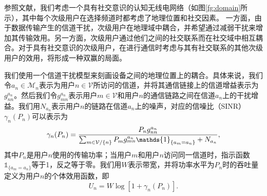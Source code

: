 参照文献\cite{Chenjournal}，我们考虑一个具有社交意识的认知无线电网络（如图\ref{fg:domain}所示），其中每个次级用户在选择频道时都考虑了地理位置和社交因素。
一方面，由于数据传输产生的信道干扰，次级用户在地理域中耦合，并希望通过减弱干扰来增加其传输效用。另一方面，次级用户通过他们之间的社交联系而在社交域中相互耦合。对于具有社交意识的次级用户，在进行通信时考虑与其有社交联系的其他次级用户的效用，将形成一种双赢的局面。

我们使用一个信道干扰模型来刻画设备之间的地理位置上的耦合。具体来说，我们令$a_n\in\mathcal{M}_n$表示为用户$n\in\mathcal{V}$所访问的信道，并将其通信链接上的信道增益表示为$g_{nn}^{a_n}$。然后我们令$g_{mn}^{a_n}$表示用户$m\in\mathcal{V}$和用户$n$的通信链路之间在信道$a_n$上的干扰增益。我们用$N_{a_n}$表示用户$n$的链路在信道$a_n$上的噪声，对应的信噪比（SINR）$\gamma_n(P_n)$可以表示为
\begin{equation}
\small
\gamma_n(P_n)=\frac{P_{n}g_{nn}^{a_n}}{\sum_{m\in \mathcal{V}/\{n\}}P_{m}g_{mn}^{a_n}\mathds{1}_{\{a_m=a_n\}}+N_{a_n}},
\end{equation}
其中$P_n$是用户$n$使用的传输功率；当用户$m$和用户$n$访问同一信道时，指示函数$\mathds{1}_{\{a_m = a_n\}}$等于1，反之等于零。我们用$W$表示带宽，并将功率水平为$P_n$时的吞吐量定义为用户$n$的个体效用函数，即
\vspace{-0.2cm}
\begin{equation}\label{indiu}
U_n=W\log[1+\gamma_n(P_n)].
\end{equation}

